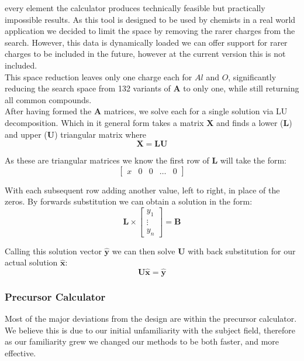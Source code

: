 every element the calculator produces technically feasible but practically impossible results. As this tool is designed to be used by chemists in a real world application we decided to limit the space by removing the rarer charges from the search. However, this data is dynamically loaded we can offer support for rarer charges to be included in the future, however at the current version this is not included. \\

This space reduction leaves only one charge each for $Al$ and $O$, significantly reducing the search space from 132 variants of $\mathbf{A}$ to only one, while still returning all common compounds. \\ 

After having formed the $\mathbf{A}$ matrices, we solve each for a single solution via LU decomposition. Which in it general form takes a matrix $\mathbf{X}$ and finds a lower ($\mathbf{L}$) and upper ($\mathbf{U}$) triangular matrix where 
\begin{equation*}
\mathbf{X} = \mathbf{L}\mathbf{U}
\end{equation*}

As these are triangular matrices we know the first row of $\mathbf{L}$ will take the form:
\begin{equation*}
\begin{bmatrix}
x & 0 & 0 & \dots & 0
\end{bmatrix}
\end{equation*}

With each subsequent row adding another value, left to right, in place of the zeros. By forwards substitution we can obtain a solution in the form:\\
\begin{equation*}
\mathbf{L} \times 
\begin{bmatrix}
y_1 \\
\vdots \\
y_n
\end{bmatrix}
=
\mathbf{B}
\end{equation*}
\vspace{0em}

Calling this solution vector $\mathbf{\hat{y}}$ we can then solve $\mathbf{U}$ with back substitution for our actual solution $\mathbf{\hat{x}}$:
\begin{equation*}
\mathbf{U}\mathbf{\hat{x}} = \mathbf{\hat{y}}
\end{equation*}

\subsubsection{Precursor Calculator}
Most of the major deviations from the design are within the precursor calculator. We believe this is due to our initial unfamiliarity with the subject field, therefore as our familiarity grew we changed our methods to be both faster, and more effective.



